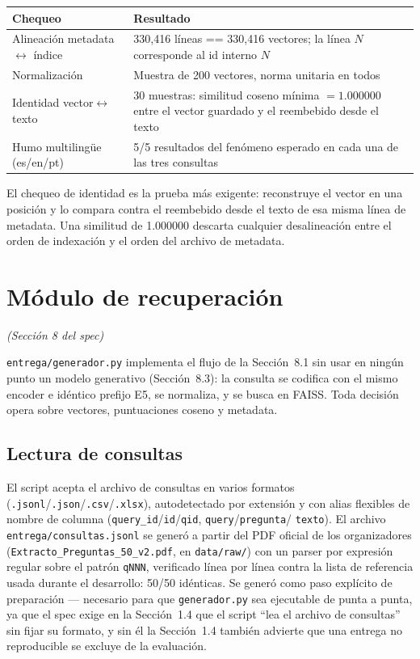 \documentclass[11pt]{article}
\newcommand{\codigo}[1]{\texttt{\small #1}}
\newcommand{\seccionspec}[1]{\textit{(Sección #1 del spec)}}
\begin{document}
\begin{center}
\begin{tabular}{@{}p{5.3cm}p{9.8cm}@{}}
\toprule
\textbf{Chequeo} & \textbf{Resultado} \\
\midrule
Alineación metadata $\leftrightarrow$ índice & 330{,}416 líneas == 330{,}416 vectores; la línea $N$ corresponde al id interno $N$ \\
Normalización & Muestra de 200 vectores, norma unitaria en todos \\
Identidad vector$\leftrightarrow$texto & 30 muestras: similitud coseno mínima $=1.000000$ entre el vector guardado y el reembebido desde el texto \\
Humo multilingüe (es/en/pt) & 5/5 resultados del fenómeno esperado en cada una de las tres consultas \\
\bottomrule
\end{tabular}
\end{center}

El chequeo de identidad es la prueba más exigente: reconstruye el vector en
una posición y lo compara contra el reembebido desde el texto de esa misma
línea de metadata. Una similitud de 1.000000 descarta cualquier
desalineación entre el orden de indexación y el orden del archivo de
metadata.

\section{Módulo de recuperación}
\seccionspec{8}

\codigo{entrega/generador.py} implementa el flujo de la Sección~8.1 sin usar
en ningún punto un modelo generativo (Sección~8.3): la consulta se codifica
con el mismo encoder e idéntico prefijo E5, se normaliza, y se busca en
FAISS. Toda decisión opera sobre vectores, puntuaciones coseno y metadata.

\subsection{Lectura de consultas}

El script acepta el archivo de consultas en varios formatos
(\codigo{.jsonl}/\codigo{.json}/\codigo{.csv}/\codigo{.xlsx}), autodetectado
por extensión y con alias flexibles de nombre de columna
(\codigo{query\_id}/\codigo{id}/\codigo{qid}, \codigo{query}/\codigo{pregunta}/
\codigo{texto}). El archivo \codigo{entrega/\allowbreak consultas.jsonl} se
generó a partir del PDF oficial de los organizadores
(\codigo{Extracto\_\allowbreak Preguntas\_50\_v2.pdf}, en \codigo{data/raw/})
con un parser por expresión regular sobre el patrón \codigo{qNNN}, verificado
línea por línea contra la lista de referencia usada durante el desarrollo:
50/50 idénticas.
Se generó como paso explícito de preparación --- necesario para que
\codigo{generador.py} sea ejecutable de punta a punta, ya que el spec exige
en la Sección~1.4 que el script ``lea el archivo de consultas'' sin fijar su
formato, y sin él la Sección~1.4 también advierte que una entrega no
reproducible se excluye de la evaluación.
\end{document}
